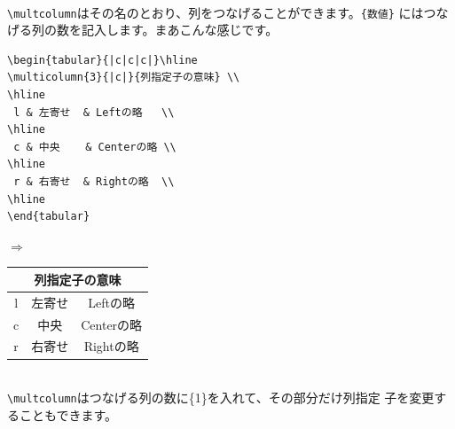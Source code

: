 \vspace*{1mm}\\
\verb+\multcolumn+はその名のとおり、列をつなげることができます。\verb+{数値}+
にはつなげる列の数を記入します。まあこんな感じです。\\
\begin{minipage}[c]{.50\textwidth}
\begin{screen}
\small
\begin{verbatim}
\begin{tabular}{|c|c|c|}\hline
\multicolumn{3}{|c|}{列指定子の意味} \\
\hline
 l & 左寄せ  & Leftの略   \\
\hline
 c & 中央    & Centerの略 \\
\hline
 r & 右寄せ  & Rightの略  \\
\hline
\end{tabular}
\end{verbatim}
\end{screen}
\end{minipage}%
$\Rightarrow$
\begin{minipage}{.45\textwidth}
\begin{shadebox}
\begin{tabular}{|c|c|c|}\hline
\multicolumn{3}{|c|}{列指定子の意味} \\
\hline
 l & 左寄せ  & Leftの略   \\
\hline
 c & 中央    & Centerの略 \\
\hline
 r & 右寄せ  & Rightの略  \\
\hline
\end{tabular}
\end{shadebox}
\end{minipage}
\vspace*{1mm}\\
\verb+\multcolumn+はつなげる列の数に\{1\}を入れて、その部分だけ列指定
子を変更することもできます。


